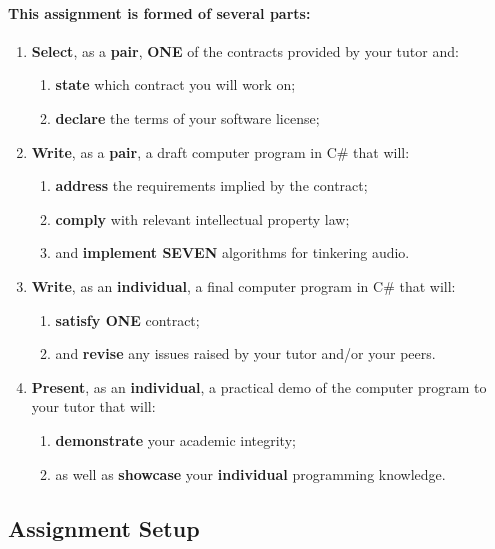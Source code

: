 \documentclass{../../fal_assignment}
\begin{document}
\paragraph{This assignment is formed of several parts:}

\begin{enumerate}[label=(\Alph*)]
    \item \textbf{Select}, as a \textbf{pair}, \textbf{ONE} of the contracts provided by your tutor and:
    	\begin{enumerate}[label=\roman*.]
    		\item \textbf{state} which contract you will work on;
     		\item \textbf{declare} the terms of your software license;
	\end{enumerate}
    \item \textbf{Write}, as a \textbf{pair}, a draft computer program in C\# that will:
    	\begin{enumerate}[label=\roman*.]
    		\item \textbf{address} the requirements implied by the contract;
    		\item \textbf{comply} with relevant intellectual property law;
    		\item and \textbf{implement SEVEN} algorithms for tinkering audio.
	\end{enumerate}
    \item \textbf{Write}, as an \textbf{individual}, a final computer program in C\# that will:
    	\begin{enumerate}[label=\roman*.]
    		\item \textbf{satisfy ONE} contract;
    		\item and \textbf{revise} any issues raised by your tutor and/or your peers.
	\end{enumerate}
    \item \textbf{Present}, as an \textbf{individual}, a practical demo of the computer program to your tutor that will:
    	\begin{enumerate}[label=\roman*.]
    		\item \textbf{demonstrate} your academic integrity;
    		\item as well as \textbf{showcase} your \textbf{individual} programming knowledge.
	\end{enumerate}
\end{enumerate}

\subsection*{Assignment Setup}
\end{document}
